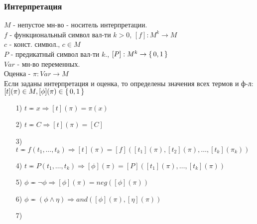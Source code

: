 \subsubsection{Интерпретация}
$M$ - непустое мн-во - носитель интерпретации. \\
$f$ - функциональный символ вал-ти $k > 0$, $[f]: M^{k} \rightarrow M$ \\
$c$ - конст. символ., $c \in M$ \\
$P$ - предикатный символ вал-ти $k$., $[P]: M^{k} \rightarrow \set{0, 1}$ \\
$Var$ - мн-во переменных. \\
Оценка - $\pi \colon Var \rightarrow M$ \\
Если заданы интерпретация и оценка, то определены значения всех термов и ф-л: $[t](\pi) \in M, [\phi](\pi) \in \set{0, 1}$
\begin{itemize}
  \item [1)] $t \eqcirc x \Rightarrow [t](\pi) = \pi(x)$ 
  \item [2) ] $t \eqcirc C \Rightarrow [t](\pi) = [C]$
  \item [3) ] $t \eqcirc f(t_1, \ldots, t_k) \Rightarrow [t](\pi) = [f]([t_1](\pi), [t_2](\pi), \ldots, [t_k](\pi_k))$
  \item [4) ] $t \eqcirc P(t_1, \ldots, t_k) \Rightarrow [\phi](\pi) = [P]([t_1](\pi), \ldots, [t_k](\pi))$
  \item [5) ] $\phi \eqcirc \neg \phi \Rightarrow [\phi](\pi) = neg([\phi](\pi))$
  \item [6) ] $\phi \eqcirc (\phi \land \eta) \Rightarrow and([\phi](\pi), [\eta](\pi))$
  \item [7) ]
\end{itemize}
